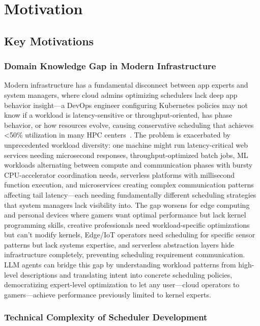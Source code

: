 \section{Motivation}

\subsection{Key Motivations}

\subsubsection{Domain Knowledge Gap in Modern Infrastructure}

Modern infrastructure has a fundamental disconnect between app experts and system managers, where cloud admins optimizing schedulers lack deep app behavior insight—a DevOps engineer configuring Kubernetes policies may not know if a workload is latency-sensitive or throughput-oriented, has phase behavior, or how resources evolve, causing conservative scheduling that achieves <50\% utilization in many HPC centers~\cite{feitelson2023utilization}. The problem is exacerbated by unprecedented workload diversity: one machine might run latency-critical web services needing microsecond responses, throughput-optimized batch jobs, ML workloads alternating between compute and communication phases with bursty CPU-accelerator coordination needs, serverless platforms with millisecond function execution, and microservices creating complex communication patterns affecting tail latency—each needing fundamentally different scheduling strategies that system managers lack visibility into. The gap worsens for edge computing and personal devices where gamers want optimal performance but lack kernel programming skills, creative professionals need workload-specific optimizations but can't modify kernels, Edge/IoT operators need scheduling for specific sensor patterns but lack systems expertise, and serverless abstraction layers hide infrastructure completely, preventing scheduling requirement communication. LLM agents can bridge this gap by understanding workload patterns from high-level descriptions and translating intent into concrete scheduling policies, democratizing expert-level optimization to let any user—cloud operators to gamers—achieve performance previously limited to kernel experts.

\subsubsection{Technical Complexity of Scheduler Development}

